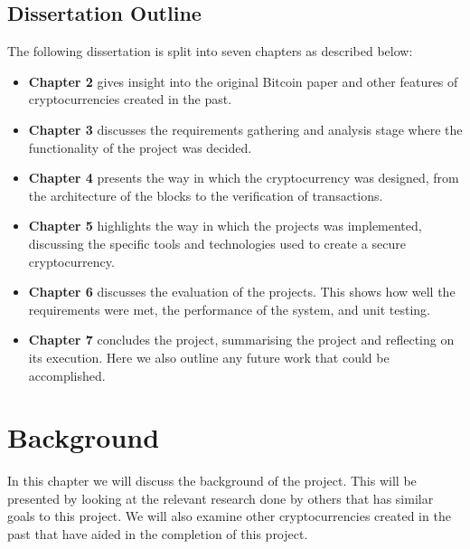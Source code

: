 \documentclass{l4proj}
\begin{document}
\section{Dissertation Outline}
The following dissertation is split into seven chapters as described below:
\begin{itemize}
    \item
        \textbf{Chapter 2} gives insight into the original Bitcoin paper and other features of cryptocurrencies
        created in the past.
    \item
        \textbf{Chapter 3} discusses the requirements gathering and analysis stage where the functionality
        of the project was decided.
    \item
        \textbf{Chapter 4} presents the way in which the cryptocurrency was designed, from the architecture of the blocks
        to the verification of transactions.
    \item
        \textbf{Chapter 5} highlights the way in which the projects was implemented, discussing the specific tools and 
        technologies used to create a secure cryptocurrency.
    \item
        \textbf{Chapter 6} discusses the evaluation of the projects. This shows how well the requirements were met, the
        performance of the system, and unit testing.
    \item
        \textbf{Chapter 7} concludes the project, summarising the project and reflecting on its execution. Here we also
        outline any future work that could be accomplished.
\end{itemize}


\chapter{Background}
In this chapter we will discuss the background of the project. This will be presented by looking at the relevant research done by 
others that has similar goals to this project. We will also examine other cryptocurrencies created in the past that have aided 
in the completion of this project.
\end{document}

